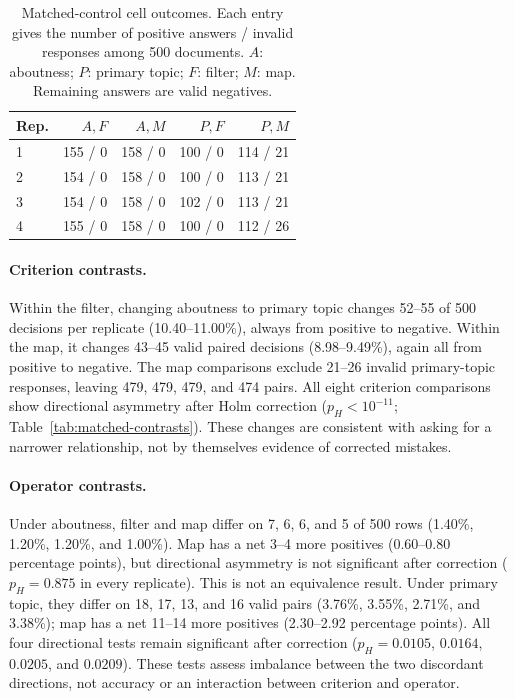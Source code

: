 \documentclass[11pt]{article}
\begin{document}
\begin{table}[t]
\centering
\small
\caption{Matched-control cell outcomes. Each entry gives the number of
positive answers / invalid responses among 500 documents. $A$: aboutness;
$P$: primary topic; $F$: filter; $M$: map. Remaining answers are valid negatives.}
\label{tab:matched-cells}
\begin{tabular}{lrrrr}
\toprule
Rep. & $A,F$ & $A,M$ & $P,F$ & $P,M$ \\
\midrule
1 & 155 / 0 & 158 / 0 & 100 / 0 & 114 / 21 \\
2 & 154 / 0 & 158 / 0 & 100 / 0 & 113 / 21 \\
3 & 154 / 0 & 158 / 0 & 102 / 0 & 113 / 21 \\
4 & 155 / 0 & 158 / 0 & 100 / 0 & 112 / 26 \\
\bottomrule
\end{tabular}
\end{table}

\paragraph{Criterion contrasts.}
Within the filter, changing aboutness to primary topic changes 52--55 of
500 decisions per replicate (10.40--11.00\%), always from positive to
negative. Within the map, it changes 43--45 valid paired decisions
(8.98--9.49\%), again all from positive to negative. The map comparisons
exclude 21--26 invalid primary-topic responses, leaving 479, 479, 479, and
474 pairs. All eight criterion comparisons show directional asymmetry after
Holm correction ($p_H<10^{-11}$; Table~\ref{tab:matched-contrasts}). These
changes are consistent with asking for a narrower relationship, not by
themselves evidence of corrected mistakes.

\paragraph{Operator contrasts.}
Under aboutness, filter and map differ on 7, 6, 6, and 5 of 500 rows
(1.40\%, 1.20\%, 1.20\%, and 1.00\%). Map has a net 3--4 more positives
(0.60--0.80 percentage points), but directional asymmetry is not significant
after correction ($p_H=0.875$ in every replicate). This is not an
equivalence result. Under primary topic, they differ on 18, 17, 13, and 16
valid pairs (3.76\%, 3.55\%, 2.71\%, and 3.38\%); map has a net 11--14 more
positives (2.30--2.92 percentage points). All four directional tests remain
significant after correction ($p_H=0.0105$, $0.0164$, $0.0205$, and $0.0209$).
These tests assess imbalance between the two discordant directions, not
accuracy or an interaction between criterion and operator.
\end{document}
